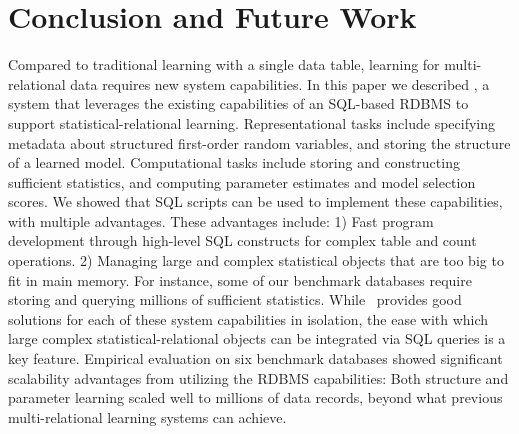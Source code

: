 \section{Conclusion and Future Work} 
Compared to traditional learning with a single data table, learning for multi-relational data requires new system capabilities. In this paper we described \FB, a system that leverages the existing capabilities of an SQL-based RDBMS to support statistical-relational learning.
Representational tasks include specifying metadata about structured first-order random variables, and storing the structure of a learned model. Computational tasks include storing and constructing sufficient statistics, and computing parameter estimates and model selection scores. 
We showed that SQL scripts can be used to implement these capabilities, with multiple advantages. These advantages include: 1) Fast program development through high-level SQL constructs for complex table and count operations. 2) Managing large and complex statistical objects that are too big to fit in main memory. 
For instance, some of our benchmark databases require storing and querying millions of sufficient statistics. While \FB\ provides good solutions for each of these system capabilities in isolation, the ease with which large complex statistical-relational objects can be integrated via SQL queries is a key feature. 
Empirical evaluation on six benchmark databases showed significant scalability advantages from utilizing the RDBMS capabilities: Both structure and parameter learning scaled well to millions of data records, beyond what previous multi-relational learning systems can achieve. 

